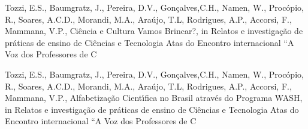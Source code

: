 \documentclass[
12pt,		%
openright,	%
twoside,  %
a4paper,			%
chapter=TITLE,		%
english,			%
french,				%
spanish,			%
brazil				%
]{USPSC-classe/USPSC}
\begin{document}
\begin{flushleft}
\begin{flushleft}
\begin{flushleft}
\begin{flushleft}
\begin{flushleft}
\begin{flushleft}
\begin{flushleft}
\begin{flushleft}
[TOZZI, 2021] Tozzi, E.S., Baumgratz, J., Pereira, D.V., Gon\c{c}alves,C.H., Namen, W., Proc\'opio, R., Soares, A.C.D., Morandi, M.A., Ara\'ujo, T.L, Rodrigues, A.P., Accorsi, F., Mammana, V.P., Ci\^encia e Cultura Vamos Brincar?, in Relatos e investiga\c{c}\~ao de pr\'aticas de ensino de Ci\^encias e Tecnologia Atas do Encontro internacional “A Voz dos Professores de C
\end{flushleft}


\end{flushleft}


\end{flushleft}


\end{flushleft}


\end{flushleft}


\end{flushleft}


\end{flushleft}


\end{flushleft}


\begin{flushleft}
\begin{flushleft}
\begin{flushleft}
\begin{flushleft}
\begin{flushleft}
\begin{flushleft}
\begin{flushleft}
\begin{flushleft}
[TOZZI, 2021a] Tozzi, E.S., Baumgratz, J., Pereira, D.V., Gon\c{c}alves,C.H., Namen, W., Proc\'opio, R., Soares, A.C.D., Morandi, M.A., Ara\'ujo, T.L, Rodrigues, A.P., Accorsi, F., Mammana, V.P., Alfabetiza\c{c}\~ao Cient\'{\i}fica no Brasil atrav\'es do Programa WASH, in Relatos e investiga\c{c}\~ao de pr\'aticas de ensino de Ci\^encias e Tecnologia Atas do Encontro internacional “A Voz dos Professores de C
\end{flushleft}


\end{flushleft}


\end{flushleft}


\end{flushleft}


\end{flushleft}


\end{flushleft}


\end{flushleft}


\end{flushleft}
\end{document}
